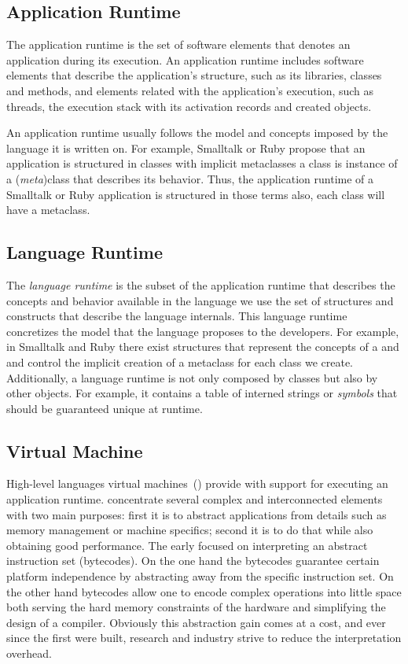 \subsection{Application Runtime}

The application runtime is the set of software elements that denotes an application during its execution. An application runtime includes software elements that describe the application's structure, such as its libraries, classes and methods, and elements related with the application's execution, such as threads, the execution stack with its activation records and created objects.

An application runtime usually follows the model and concepts imposed by the language it is written on. For example, Smalltalk or Ruby propose that an application is structured in classes with implicit metaclasses \ie a class is instance of a (\emph{meta})class that describes its behavior. Thus, the application runtime of a Smalltalk or Ruby application is structured in those terms also, each class will have a metaclass.

\subsection{Language Runtime}

The \emph{language runtime} is the subset of the application runtime that describes the concepts and behavior available in the language we use \ie the set of structures and constructs that describe the language internals. This language runtime concretizes the model that the language proposes to the developers. For example, in Smalltalk and Ruby there exist structures that represent the concepts of a  and  and control the implicit creation of a metaclass for each class we create. Additionally, a language runtime is not only composed by classes but also by other objects. For example, it contains a table of interned strings or \emph{symbols} that should be guaranteed unique at runtime.

\subsection{Virtual Machine}

High-level languages virtual machines~(\VMs) provide with support for executing an application runtime.
\VMs concentrate several complex and interconnected elements with two main purposes: first it is to abstract applications from details such as memory management or machine specifics; second it is to do that while also obtaining good performance.
The early \VMs focused on interpreting an abstract instruction set (bytecodes).
On the one hand the bytecodes guarantee certain platform independence by abstracting away from the \CPU specific instruction set.
On the other hand bytecodes allow one to encode complex operations into little space both serving the hard memory constraints of the hardware and simplifying the design of a compiler.
Obviously this abstraction gain comes at a cost, and ever since the first \VMs were built, research and industry strive to reduce the interpretation overhead.

